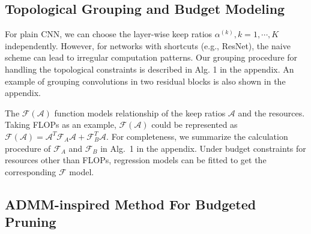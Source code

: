 \documentclass[runningheads]{llncs}
\newcommand{\flops}{\mathcal{F}}
\newcommand{\alphas}{\mathcal{A}}
\begin{document}
  
  
  
  \subsection{Topological Grouping and Budget Modeling}
  \label{sec:method-grouping}
  
  
  For plain CNN, we can choose the layer-wise keep ratios $\alpha^{(k)}, k=1,\cdots,K$ independently. However, for networks with shortcuts (e.g., ResNet), the naive scheme can lead to irregular computation patterns. 
  Our grouping procedure for handling the topological constraints is described in Alg. 1 in the appendix. An example of grouping convolutions in two residual blocks is also shown in the appendix.
  
  The $\flops(\alphas)$ function models relationship of the keep ratios $\alphas$ and the resources. Taking FLOPs as an example, $\flops(\alphas)$ could be represented as $\flops(\alphas) = \alphas^T \flops_A \alphas + \flops_B^T \alphas$. 
  For completeness, we summarize the calculation procedure of $\flops_A$ and $\flops_B$ in Alg.~1 in the appendix. 
  Under budget constraints for resources other than FLOPs, regression models can be fitted to get the corresponding $\flops$ model.
  
  
  
  

  
  \subsection{ADMM-inspired Method For Budgeted Pruning}
  \label{sec:admm_for_bp}
  
\end{document}
